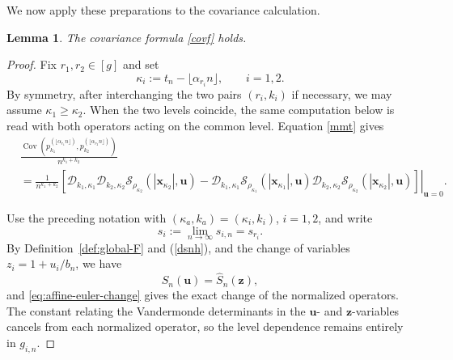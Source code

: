\documentclass[11pt]{amsart}
\theoremstyle{plain}
\newtheorem{lemma}[theorem]{Lemma}
\numberwithin{equation}{section}
\numberwithin{theorem}{section}
\numberwithin{figure}{section}
\begin{document}
We now apply these preparations to the covariance calculation.

\begin{lemma}\label{le43}The covariance formula \eqref{covf} holds.
\end{lemma}
\begin{proof}
Fix $r_1,r_2\in[g]$ and set
\begin{equation}
    \kappa_i:=t_n-\lfloor\alpha_{r_i}n\rfloor,
    \qquad i=1,2.
    \label{dkr}
\end{equation}
By symmetry, after interchanging the two pairs $(r_i,k_i)$ if necessary,
we may assume $\kappa_1\geq\kappa_2$.  When the two levels coincide, the
same computation below is read with both operators acting on the common
level.  Equation \eqref{mmt} gives
\begin{align*}
&\frac{\operatorname{Cov}\left(
    p_{k_1}^{(\lfloor\alpha_{r_1}n\rfloor)},
    p_{k_2}^{(\lfloor\alpha_{r_2}n\rfloor)}
\right)}{n^{k_1+k_2}}\\
&=\left.\frac{1}{n^{k_1+k_2}}\left[
\mathcal{D}_{k_1,\kappa_1}\mathcal{D}_{k_2,\kappa_2}
\mathcal{S}_{\rho_{\kappa_2}}(|\mathbf{x}_{\kappa_2}|,\mathbf{u})
-\mathcal{D}_{k_1,\kappa_1}
\mathcal{S}_{\rho_{\kappa_1}}(|\mathbf{x}_{\kappa_1}|,\mathbf{u})
\mathcal{D}_{k_2,\kappa_2}
\mathcal{S}_{\rho_{\kappa_2}}(|\mathbf{x}_{\kappa_2}|,\mathbf{u})
\right]\right|_{\mathbf{u}=0}.
\end{align*}
\begingroup

Use the preceding notation with
\((\kappa_a,k_a)=(\kappa_i,k_i)\), \(i=1,2\), and write
\[
    s_i:=\lim_{n\to\infty}s_{i,n}=s_{r_i}.
\]
By Definition~\ref{def:global-F} and (\ref{dsnh}), and the change of variables
\(z_i=1+u_i/b_n\), we have
\[
    S_n(\mathbf u)=\widehat S_n(\mathbf z),
\] and
\eqref{eq:affine-euler-change} gives the exact change of the normalized
operators. The constant relating the Vandermonde determinants in the
\(\mathbf u\)- and \(\mathbf z\)-variables cancels from each normalized
operator, so the level dependence remains entirely in \(g_{i,n}\).


\end{proof}
\end{document}
